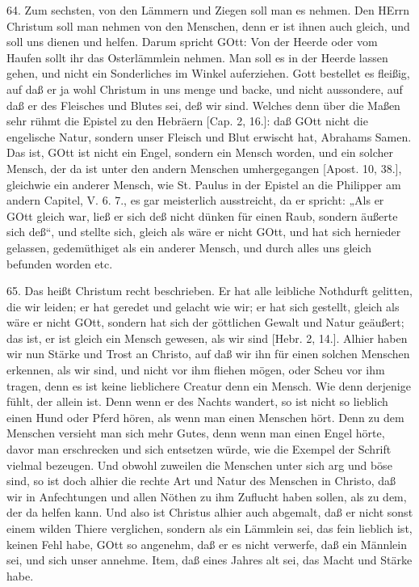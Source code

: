 64. Zum sechsten, von den Lämmern und Ziegen soll man es nehmen. Den HErrn Christum soll man nehmen von den Menschen, denn er ist ihnen auch gleich, und soll uns dienen und helfen. Darum spricht GOtt: Von der Heerde oder vom Haufen sollt ihr das Osterlämmlein nehmen. Man soll es in der Heerde lassen gehen, und nicht ein Sonderliches im Winkel auferziehen. Gott bestellet es fleißig, auf daß er ja wohl Christum in uns menge und backe, und nicht aussondere, auf daß er des Fleisches und Blutes sei, deß wir sind. Welches denn über die Maßen sehr rühmt die Epistel zu den Hebräern [Cap. 2, 16.]: daß GOtt nicht die engelische Natur, sondern unser Fleisch und Blut erwischt hat, Abrahams Samen. Das ist, GOtt ist nicht ein Engel, sondern ein Mensch worden, und ein solcher Mensch, der da ist unter den andern Menschen umhergegangen [Apost. 10, 38.], gleichwie ein anderer Mensch, wie St. Paulus in der Epistel an die Philipper am andern Capitel, V. 6. 7., es gar meisterlich ausstreicht, da er spricht: „Als er GOtt gleich war, ließ er sich deß nicht dünken für einen Raub, sondern äußerte sich deß“, und stellte sich, gleich als wäre er nicht GOtt, und hat sich hernieder gelassen, gedemüthiget als ein anderer Mensch, und durch alles uns gleich befunden worden etc.

65. Das heißt Christum recht beschrieben. Er hat alle leibliche Nothdurft gelitten, die wir leiden; er hat geredet und gelacht wie wir; er hat sich gestellt, gleich als wäre er nicht GOtt, sondern hat sich der göttlichen Gewalt und Natur geäußert; das ist, er ist gleich ein Mensch gewesen, als wir sind [Hebr. 2, 14.]. Alhier haben wir nun Stärke und Trost an Christo, auf daß wir ihn für einen solchen Menschen erkennen, als wir sind, und nicht vor ihm fliehen mögen, oder Scheu vor ihm tragen, denn es ist keine lieblichere Creatur denn ein Mensch. Wie denn derjenige fühlt, der allein ist. Denn wenn er des Nachts wandert, so ist nicht so lieblich einen Hund oder Pferd hören, als wenn man einen Menschen hört. Denn zu dem Menschen versieht man sich mehr Gutes, denn wenn man einen Engel hörte, davor man erschrecken und sich entsetzen würde, wie die Exempel der Schrift vielmal bezeugen. Und obwohl zuweilen die Menschen unter sich arg und böse sind, so ist doch alhier die rechte Art und Natur des Menschen in Christo, daß wir in Anfechtungen und allen Nöthen zu ihm Zuflucht haben sollen, als zu dem, der da helfen kann. Und also ist Christus alhier auch abgemalt, daß er nicht sonst einem wilden Thiere verglichen, sondern als ein Lämmlein sei, das fein lieblich ist, keinen Fehl habe, GOtt so angenehm, daß er es nicht verwerfe, daß ein Männlein sei, und sich unser annehme. Item, daß eines Jahres alt sei, das Macht und Stärke habe.


